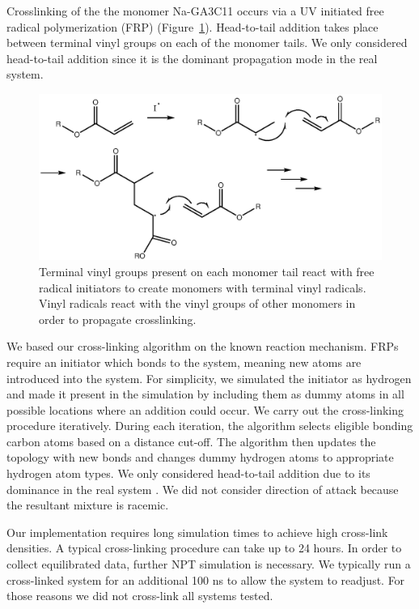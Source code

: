 \documentclass{article}
\begin{document}
  Crosslinking of the the monomer Na-GA3C11 occurs via a UV initiated free
  radical polymerization (FRP) (Figure~\ref{fig:xlink_mech}). Head-to-tail addition
  takes place between terminal vinyl groups on each of the monomer tails. We
  only considered head-to-tail addition since it is the dominant propagation mode
  in the real system.   

  \begin{figure}[!htb]
  \centering
  \includegraphics[width=\textwidth]{Crosslink_mechanism.eps}
  \caption{Terminal vinyl groups present on each monomer tail react with free
	  radical initiators to create monomers with terminal vinyl radicals.  Vinyl
	  radicals react with the vinyl groups of other monomers in order to propagate
	  crosslinking.}\label{fig:xlink_mech}
  \end{figure}
  
  We based our cross-linking algorithm on the known reaction mechanism.
  FRPs require an initiator which bonds to the system, meaning new atoms are
  introduced into the system. For simplicity, we simulated the initiator as
  hydrogen and made it present in the simulation by including them as dummy atoms
  in all possible locations where an addition could occur. We carry out the
  cross-linking procedure iteratively. During each iteration, the algorithm
  selects eligible bonding carbon atoms based on a distance cut-off. The algorithm
  then updates the topology with new bonds and changes dummy hydrogen atoms to appropriate
  hydrogen atom types. We only considered head-to-tail addition
  due to its dominance in the real system \cite{young_introduction_2011}. We did
  not consider direction of attack because the resultant mixture is racemic.

  Our implementation requires long simulation times to achieve high cross-link 
  densities. A typical cross-linking procedure can take up to 24 hours. In
  order to collect equilibrated data, further NPT simulation is necessary. We
  typically run a cross-linked system for an additional 100 ns to allow the system
  to readjust. For those reasons we did not cross-link all systems tested.
  
\end{document}
